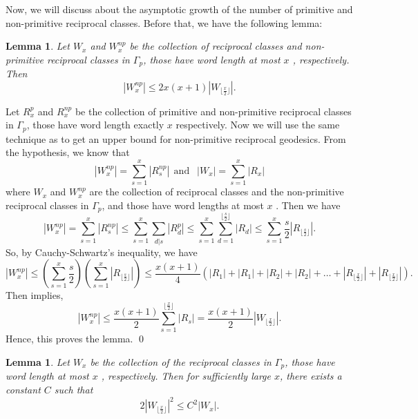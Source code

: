 \documentclass[11pt]{amsart}
\renewenvironment{proof}{{\bfseries Proof.}}{\qed}
\numberwithin{equation}{section}
\newtheorem{lemma}[theorem]{Lemma}
\numberwithin{equation}{section}
\begin{document}
            Now, we will discuss about the asymptotic growth of the number of primitive and non-primitive reciprocal classes. Before that, we have the following lemma:
	            \begin{lemma}\label{7.1}
	            	Let $W_{x}$ and $W^{np}_x$ be the collection of reciprocal classes and non-primitive reciprocal classes in $\Gamma_{p}$, those have word length at most $x$ , respectively. Then
	            	 \[\left|W^{np}_{x}\right|\leq 2x(x+1)\left|W_{\lfloor\frac{x}{2}\rfloor}\right|.\]
	            	
	            \end{lemma}\begin{proof}
	             Let $R^p_{x}$ and $R^{np}_x$ be the collection of primitive and non-primitive reciprocal classes in $\Gamma_{p}$, those have word length exactly $x$ respectively. Now we will use the same technique as \cite{DG2} to get an upper bound for non-primitive reciprocal geodesics.
	          From the hypothesis, we know that \[\left|W^{np}_{x}\right|=\sum_{s=1}^{x} \left|R^{np}_{s}\right|~~\text{and }~~\left|W_{x}\right|=\sum_{s=1}^{x}\left|R_{x}\right|\] where $W_{x}$ and  $W^{np}_{x}$ are the collection of reciprocal classes and the non-primitive reciprocal classes in $\Gamma_{p}$, and those have word lengths at most $x$ . Then we have
	          \[\left|W^{np}_{x}\right|=\sum_{s=1}^{x} \left|R^{np}_{s}\right|\leq \sum_{s=1}^{x}\sum_{d|s}\left|R^{p}_{d}\right|\leq \sum_{s=1}^{x}\sum_{d=1}^{\lfloor\frac{s}{2}\rfloor}\left|R_{d}\right|\leq \sum_{s=1}^{x}\frac{s}{2}\left|R_{\lfloor\frac{s}{2}\rfloor}\right|.\]
	          So, by Cauchy-Schwartz's inequality, we have
	          \[\left|W^{np}_{x}\right|\leq\left(\sum_{s=1}^{x}\frac{s}{2}\right)\left(\sum_{s=1}^{x}\left|R_{\lfloor\frac{s}{2}\rfloor}\right|\right)\leq \frac{x(x+1)}{4}(|R_{1}|+|R_{1}|+|R_{2}|+|R_{2}|+\dots+|R_{\lfloor\frac{x}{2}\rfloor}|+|R_{\lfloor\frac{x}{2}\rfloor}|).\]
	          Then implies,
	          \[\left|W^{np}_{x}\right|\leq \frac{x(x+1)}{2}\sum_{s=1}^{\lfloor\frac{x}{2}\rfloor}\left|R_{s}\right|=\frac{x(x+1)}{2}\left|W_{\lfloor\frac{x}{2}\rfloor}\right|.\]
	           Hence, this proves the lemma. \end{proof}
	          \begin{lemma}\label{7.2}
	          		Let $W_{x}$ be the collection of the reciprocal classes in $\Gamma_{p}$, those have word length at most $x$ , respectively. Then for sufficiently large $x$, there exists a constant $C$ such that
	          		\[ 2\left|W_{\lfloor\frac{x}{2}\rfloor}\right|^{2}\leq C^2\left|W_{x}\right|. \]
	          \end{lemma}
\end{document}
